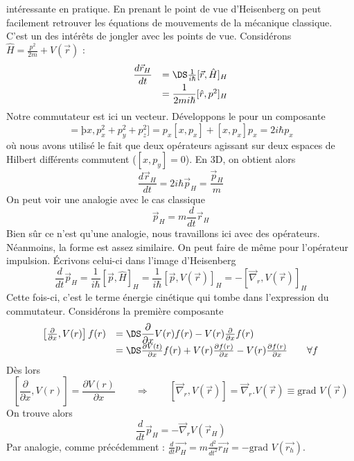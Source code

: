 intéressante en pratique. En prenant le point de vue d'Heisenberg on peut facilement 
retrouver les équations de mouvements de la mécanique classique. C'est un des intérêts de 
jongler avec les points de vue. Considérons $\hat{H}=\frac{p^2}{2m}+V(\vec{r})$ :
\begin{equation}
\begin{array}{ll}
\dfrac{d\vec{r}_H}{dt} &=\DS \frac{1}{i\hbar}[\vec{r},\hat{H}]_H\\
&= \dfrac{1}{2m i\hbar}[\hat{r},p^2]_H
\end{array}
\end{equation}
Notre commutateur est ici un vecteur. Développons le pour un composante
\begin{equation}
[x,p^2] = þx, p_x^2+p_y^2+p_z^2] = p_x[x,p_x]+[x,p_x]p_x = 2i\hbar p_x
\end{equation}
où nous avons utilisé le fait que deux opérateurs agissant sur deux espaces de Hilbert différents 
commutent ($[x,p_y]=0$). En 3D, on obtient alors
\begin{equation}
\dfrac{d\vec{r}_H}{dt} = 2i\hbar \vec{p}_H = \dfrac{\vec{p}_H}{m}
\end{equation}
On peut voir une analogie avec le cas classique
\begin{equation}
\vec{p}_H = m\dfrac{d}{dt}\vec{r}_H 
\end{equation}
Bien sûr ce n'est qu'une analogie, nous travaillons ici avec des opérateurs. Néanmoins, la forme est 
assez similaire. On peut faire de même pour l'opérateur impulsion. Écrivons celui-ci dans l'image 
d'Heisenberg
\begin{equation}
\dfrac{d}{dt}\vec{p}_H = \dfrac{1}{i\hbar}[\vec{p},\hat{H}]_H = \frac{1}{i\hbar}[\vec{p},V(\vec{r})]_H =
-[\vec{\nabla}_r,V(\vec{r})]_H
\end{equation}
Cette fois-ci, c'est le terme énergie cinétique qui tombe dans l'expression du commutateur.  Considérons 
la première composante
\begin{equation}
\begin{array}{ll}
\left[\frac{\partial}{\partial x}, V(r)\right]f(r) &=\DS \dfrac{\partial}{\partial x}V(r)f(r) - V(r)\frac{
\partial}{\partial x}f(r)\\
&=\DS \frac{\partial V(t)}{\partial x}f(r) + V(r)\frac{\partial f(r)}{\partial x}-V(r)\frac{\partial f(r)}{\partial x}\qquad \forall f
\end{array}
\end{equation}
Dès lors
\begin{equation}
\left[\frac{\partial}{\partial x}, V(r)\right] = \dfrac{\partial V(r)}{\partial x} \qquad \Longrightarrow\qquad
[\vec{\nabla}_r,V(\vec{r})] = \vec{\nabla}_r.V(\vec{r}) \equiv \text{grad } V(\vec{r})
\end{equation}
On trouve alors 
\begin{equation}
\dfrac{d}{dt}\vec{p}_H = -\vec{\nabla}_rV(\vec{r}_H)
\end{equation}
Par analogie, comme précédemment : $\frac{d}{dt}\vec{p_H} =m\frac{d^2}{dt^2}\vec{r_H}= -\text{grad }V(\vec{r_h})$.


